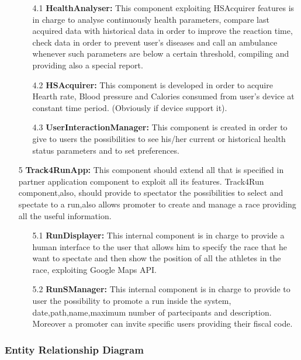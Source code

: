 \begin{enumerate}
	\begin{enumerate}
	\item [4.1]\textbf{HealthAnalyser: }
	This component exploiting HSAcquirer features is in charge to analyse continuously health parameters, compare last acquired data with historical data in order to improve the reaction time, check data in order to prevent user's diseases and call an ambulance whenever such parameters are below a certain threshold, compiling and providing also a special report.
	
	\item [4.2]\textbf{HSAcquirer:}
	This component is developed in order to acquire Hearth rate, Blood pressure and Calories consumed from user's device at constant time period. (Obviously if device support it). 
	
	\item [4.3]\textbf{UserInteractionManager:}
	This component is created in order to give to users the possibilities to see his/her current or historical health status parameters and to set preferences.
	\end{enumerate}
	

\item [5]\textbf{Track4RunApp: }
This component should extend all that is specified in partner application component to exploit all its features. Track4Run component,also, should provide to spectator the possibilities to select and spectate to a run,also allows promoter to create and manage a race providing all the useful information.
	
		\begin{enumerate}
	\item [5.1]\textbf{RunDisplayer: }
	 This internal component is in charge to provide a human interface to the user that allows him to specify the race that he want to spectate and then show the position of all the athletes in the race, exploiting Google Maps API.
	
	\item [5.2]\textbf{RunSManager: }
	This internal component is in charge to provide to user the possibility to promote a run inside the system, date,path,name,maximum number of partecipants and description. Moreover a promoter can invite specific users providing their fiscal code. 
	\end{enumerate}

\end{enumerate}

\subsubsection{Entity Relationship Diagram}

